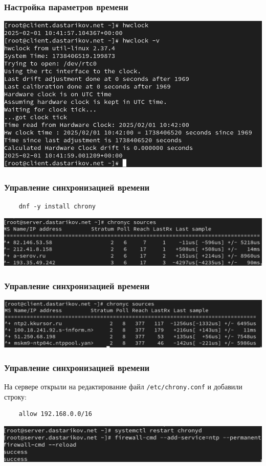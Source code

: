 \begin{frame}
  \frametitle{Настройка параметров времени}
    \centering
    \includegraphics[width=\textwidth]{../images/image06.png}
\end{frame}

\begin{frame}[fragile]
\frametitle{Управление синхронизацией времени}
  \begin{verbatim}
    dnf -y install chrony
  \end{verbatim}
    \centering
    \includegraphics[width=\textwidth]{../images/image08.png}
\end{frame}

\begin{frame}
\frametitle{Управление синхронизацией времени}
    \centering
    \includegraphics[width=\textwidth]{../images/image09.png}
\end{frame}

\begin{frame}[fragile]
\frametitle{Управление синхронизацией времени}
На сервере открыли на редактирование файл \texttt{/etc/chrony.conf} и добавили строку:
  \begin{verbatim}
    allow 192.168.0.0/16
  \end{verbatim}
    \centering
    \includegraphics[width=\textwidth]{../images/image11.png}
\end{frame}

